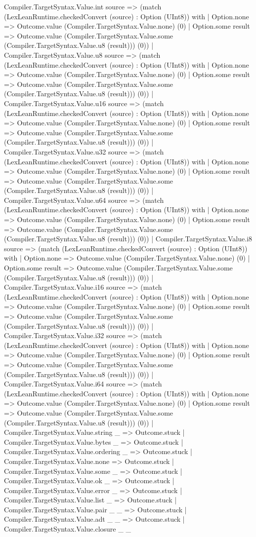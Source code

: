 \documentclass[11pt]{article}
\begin{document}
Compiler.TargetSyntax.Value.int source => (match (LexLeanRuntime.checkedConvert (source) : Option (UInt8)) with | Option.none => Outcome.value (Compiler.TargetSyntax.Value.none) (0) | Option.some result => Outcome.value (Compiler.TargetSyntax.Value.some (Compiler.TargetSyntax.Value.u8 (result))) (0)) | Compiler.TargetSyntax.Value.u8 source => (match (LexLeanRuntime.checkedConvert (source) : Option (UInt8)) with | Option.none => Outcome.value (Compiler.TargetSyntax.Value.none) (0) | Option.some result => Outcome.value (Compiler.TargetSyntax.Value.some (Compiler.TargetSyntax.Value.u8 (result))) (0)) | Compiler.TargetSyntax.Value.u16 source => (match (LexLeanRuntime.checkedConvert (source) : Option (UInt8)) with | Option.none => Outcome.value (Compiler.TargetSyntax.Value.none) (0) | Option.some result => Outcome.value (Compiler.TargetSyntax.Value.some (Compiler.TargetSyntax.Value.u8 (result))) (0)) | Compiler.TargetSyntax.Value.u32 source => (match (LexLeanRuntime.checkedConvert (source) : Option (UInt8)) with | Option.none => Outcome.value (Compiler.TargetSyntax.Value.none) (0) | Option.some result => Outcome.value (Compiler.TargetSyntax.Value.some (Compiler.TargetSyntax.Value.u8 (result))) (0)) | Compiler.TargetSyntax.Value.u64 source => (match (LexLeanRuntime.checkedConvert (source) : Option (UInt8)) with | Option.none => Outcome.value (Compiler.TargetSyntax.Value.none) (0) | Option.some result => Outcome.value (Compiler.TargetSyntax.Value.some (Compiler.TargetSyntax.Value.u8 (result))) (0)) | Compiler.TargetSyntax.Value.i8 source => (match (LexLeanRuntime.checkedConvert (source) : Option (UInt8)) with | Option.none => Outcome.value (Compiler.TargetSyntax.Value.none) (0) | Option.some result => Outcome.value (Compiler.TargetSyntax.Value.some (Compiler.TargetSyntax.Value.u8 (result))) (0)) | Compiler.TargetSyntax.Value.i16 source => (match (LexLeanRuntime.checkedConvert (source) : Option (UInt8)) with | Option.none => Outcome.value (Compiler.TargetSyntax.Value.none) (0) | Option.some result => Outcome.value (Compiler.TargetSyntax.Value.some (Compiler.TargetSyntax.Value.u8 (result))) (0)) | Compiler.TargetSyntax.Value.i32 source => (match (LexLeanRuntime.checkedConvert (source) : Option (UInt8)) with | Option.none => Outcome.value (Compiler.TargetSyntax.Value.none) (0) | Option.some result => Outcome.value (Compiler.TargetSyntax.Value.some (Compiler.TargetSyntax.Value.u8 (result))) (0)) | Compiler.TargetSyntax.Value.i64 source => (match (LexLeanRuntime.checkedConvert (source) : Option (UInt8)) with | Option.none => Outcome.value (Compiler.TargetSyntax.Value.none) (0) | Option.some result => Outcome.value (Compiler.TargetSyntax.Value.some (Compiler.TargetSyntax.Value.u8 (result))) (0)) | Compiler.TargetSyntax.Value.string \_ => Outcome.stuck | Compiler.TargetSyntax.Value.bytes \_ => Outcome.stuck | Compiler.TargetSyntax.Value.ordering \_ => Outcome.stuck | Compiler.TargetSyntax.Value.none => Outcome.stuck | Compiler.TargetSyntax.Value.some \_ => Outcome.stuck | Compiler.TargetSyntax.Value.ok \_ => Outcome.stuck | Compiler.TargetSyntax.Value.error \_ => Outcome.stuck | Compiler.TargetSyntax.Value.list \_ => Outcome.stuck | Compiler.TargetSyntax.Value.pair \_ \_ => Outcome.stuck | Compiler.TargetSyntax.Value.adt \_ \_ => Outcome.stuck | Compiler.TargetSyntax.Value.closure \_ \_ 
\end{document}
